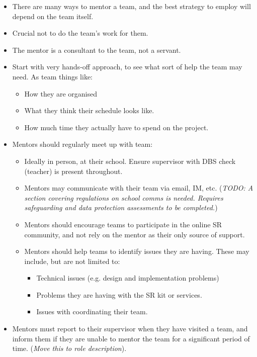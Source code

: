 \begin{itemize}
\item There are many ways to mentor a team, and the best strategy to employ will depend on the team itself.
\item Crucial not to do the team's work for them.
\item The mentor is a consultant to the team, not a servant.
\item Start with very hands-off approach, to see what sort of help the team may need.  As team things like:
  \begin{itemize}
  \item How they are organised
  \item What they think their schedule looks like.
  \item How much time they actually have to spend on the project.
  \end{itemize}
\item Mentors should regularly meet up with team:
  \begin{itemize}
  \item Ideally in person, at their school.  Ensure supervisor with DBS check (teacher) is present throughout.
  \item Mentors may communicate with their team via email, IM, etc. (\textit{TODO: A section covering regulations on school comms is needed.  Requires safeguarding and data protection assessments to be completed.})

  \item Mentors should encourage teams to participate in the online SR community, and not rely on the mentor as their only source of support.

  \item Mentors should help teams to identify issues they are having.  These may include, but are not limited to:
    \begin{itemize}
    \item Technical issues (e.g. design and implementation problems)
    \item Problems they are having with the SR kit or services.
    \item Issues with coordinating their team.
    \end{itemize}
  \end{itemize}

\item Mentors must report to their supervisor when they have visited a team, and inform them if they are unable to mentor the team for a significant period of time. (\textit{Move this to role description}).


\end{itemize}

